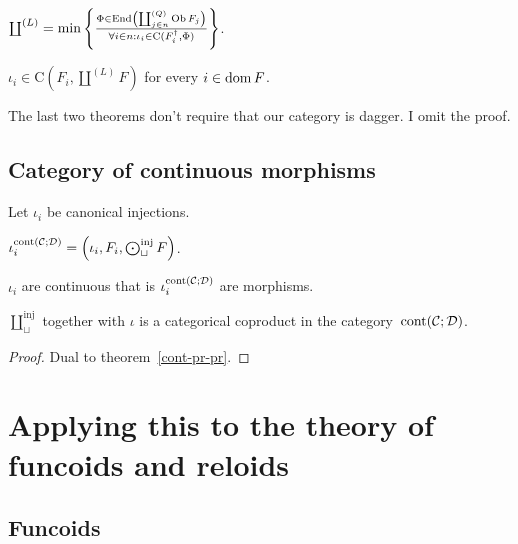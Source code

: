 \begin{obvious}
$\coprod^{(L)} = \min \left\{ \frac{ \Phi \in \operatorname{End} \left( \coprod^{(Q)}_{j \in
n} \operatorname{Ob} F_j \right) }{ \forall i \in n : \iota_i
\in \mathrm{C} (F_i^{\dagger} , \Phi) }\right\}$.{\hspace*{\fill}}{\medskip}
\end{obvious}

\begin{cor}
  $\iota_i \in \mathrm{C} \left( F_i , \coprod^{(L)} F \right)$ for every $i
  \in \operatorname{dom} F$.
\end{cor}

\begin{rem}
The last two theorems don't require that our category is dagger. I omit the proof.
\end{rem}

\subsection{Category of continuous morphisms}

Let $\iota_i$ be canonical injections.

\begin{defn}
$\iota^{\operatorname{cont}(\mathcal C;\mathcal D)}_i = \left(\iota_i,F_i,\bigodot^{\operatorname{inj}}_{\sqcup}F\right)$.
\end{defn}

\begin{obvious}
$\iota_i$ are continuous that is $\iota^{\operatorname{cont}(\mathcal C;\mathcal D)}_i$ are morphisms.
\end{obvious}

\begin{thm}
$\coprod^{\operatorname{inj}}_{\sqcup}$ together with $\iota$ is a categorical coproduct in the category~$\operatorname{cont}(\mathcal C;\mathcal D)$.
\end{thm}

\begin{proof}
Dual to theorem~\ref{cont-pr-pr}.
\end{proof}

\section{Applying this to the theory of funcoids and reloids}

\subsection{Funcoids}

